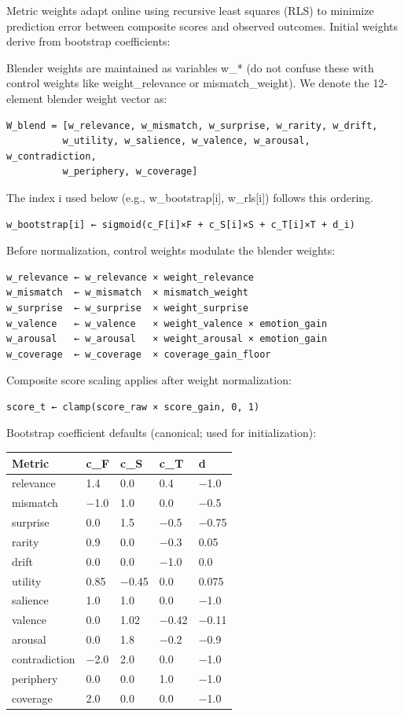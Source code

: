 \documentclass[
  letterpaper,
  DIV=11,
  numbers=noendperiod]{scrartcl}
\begin{document}
Metric weights adapt online using recursive least squares (RLS) to
minimize prediction error between composite scores and observed
outcomes. Initial weights derive from bootstrap coefficients:

Blender weights are maintained as variables w\_* (do not confuse these
with control weights like weight\_relevance or mismatch\_weight). We
denote the 12-element blender weight vector as:

\begin{verbatim}
W_blend = [w_relevance, w_mismatch, w_surprise, w_rarity, w_drift,
          w_utility, w_salience, w_valence, w_arousal, w_contradiction,
          w_periphery, w_coverage]
\end{verbatim}

The index i used below (e.g., w\_bootstrap{[}i{]}, w\_rls{[}i{]})
follows this ordering.

\begin{verbatim}
w_bootstrap[i] ← sigmoid(c_F[i]×F + c_S[i]×S + c_T[i]×T + d_i)
\end{verbatim}

Before normalization, control weights modulate the blender weights:

\begin{verbatim}
w_relevance ← w_relevance × weight_relevance
w_mismatch  ← w_mismatch  × mismatch_weight
w_surprise  ← w_surprise  × weight_surprise
w_valence   ← w_valence   × weight_valence × emotion_gain
w_arousal   ← w_arousal   × weight_arousal × emotion_gain
w_coverage  ← w_coverage  × coverage_gain_floor
\end{verbatim}

Composite score scaling applies after weight normalization:

\begin{verbatim}
score_t ← clamp(score_raw × score_gain, 0, 1)
\end{verbatim}

Bootstrap coefficient defaults (canonical; used for initialization):

\begin{longtable}[]{@{}lllll@{}}
\toprule\noalign{}
Metric & c\_F & c\_S & c\_T & d \\
\midrule\noalign{}
\endhead
\bottomrule\noalign{}
\endlastfoot
relevance & 1.4 & 0.0 & 0.4 & −1.0 \\
mismatch & −1.0 & 1.0 & 0.0 & −0.5 \\
surprise & 0.0 & 1.5 & −0.5 & −0.75 \\
rarity & 0.9 & 0.0 & −0.3 & 0.05 \\
drift & 0.0 & 0.0 & −1.0 & 0.0 \\
utility & 0.85 & −0.45 & 0.0 & 0.075 \\
salience & 1.0 & 1.0 & 0.0 & −1.0 \\
valence & 0.0 & 1.02 & −0.42 & −0.11 \\
arousal & 0.0 & 1.8 & −0.2 & −0.9 \\
contradiction & −2.0 & 2.0 & 0.0 & −1.0 \\
periphery & 0.0 & 0.0 & 1.0 & −1.0 \\
coverage & 2.0 & 0.0 & 0.0 & −1.0 \\
\end{longtable}
\end{document}
